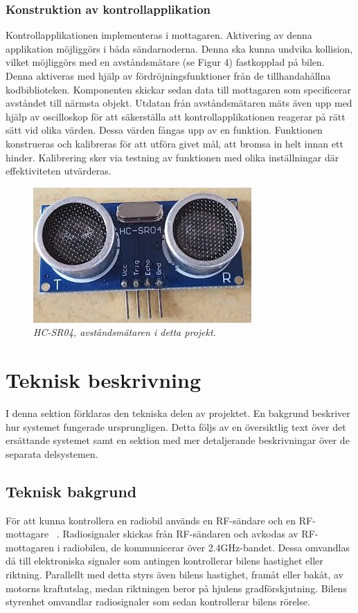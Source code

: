 \documentclass[a4paper]{article}
\begin{document}
\subsubsection{Konstruktion av kontrollapplikation}
Kontrollapplikationen implementeras i mottagaren. Aktivering av denna applikation möjliggörs i båda sändarnoderna. Denna ska kunna undvika kollision, vilket möjliggörs med en avståndsmätare (se Figur 4) fastkopplad på bilen. Denna aktiveras med hjälp av fördröjningsfunktioner från de tillhandahållna kodbiblioteken. Komponenten skickar sedan data till mottagaren som specificerar avståndet till närmsta objekt. Utdatan från avståndsmätaren mäts även upp med hjälp av oscilloskop för att säkerställa att kontrollapplikationen reagerar på rätt sätt vid olika värden. Dessa värden fångas upp av en funktion. Funktionen konstrueras och kalibreras för att utföra givet mål, att bromsa in helt innan ett hinder. Kalibrering sker via testning av funktionen med olika inställningar där effektiviteten utvärderas.


\begin{figure}[H]
\includegraphics[scale=0.6]{DistanceMeasurementFront.jpg}
\centering
\caption{\it HC-SR04, avståndsmätaren i detta projekt.}
\end{figure}



\newpage
\section{Teknisk beskrivning}
I denna sektion förklaras den tekniska delen av projektet. En bakgrund beskriver hur systemet fungerade ursprungligen. Detta följs av en översiktlig text över det ersättande systemet samt en sektion med mer detaljerande beskrivningar över de separata delsystemen.


\subsection{Teknisk bakgrund}
För att kunna kontrollera en radiobil används en RF-sändare och en RF-mottagare ~\cite{RCTechnique}. Radiosignaler skickas från RF-sändaren och avkodas av RF-mottagaren i radiobilen, de kommunicerar över 2.4GHz-bandet. Dessa omvandlas då till elektroniska signaler som antingen kontrollerar bilens hastighet eller riktning. Parallellt med detta styrs även bilens hastighet, framåt eller bakåt, av motorns kraftutslag, medan riktningen beror på hjulens gradförskjutning. Bilens styrenhet omvandlar radiosignaler som sedan kontrollerar bilens rörelse.
\end{document}
